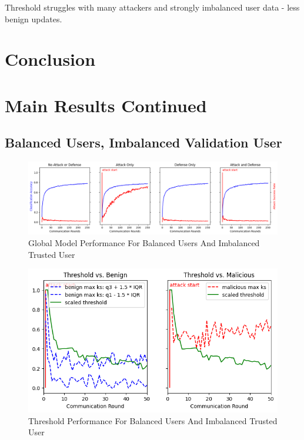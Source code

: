 \documentclass{article} %
\begin{document}
Threshold struggles with many attackers and strongly imbalanced user data - less benign updates.

% 
\section{Conclusion}

%



%
\appendix

%
\section{Main Results Continued}

%
\subsection{Balanced Users, Imbalanced Validation User}
\label{sec.imbal_val}

\begin{figure}[H]
    \centering
    \includegraphics[width=\textwidth]{01_trusted/centralized/alpha10000--alpha_val1/visuals/accuracy--n_malicious1--m_start1.png}
    \caption{Global Model Performance For Balanced Users And Imbalanced Trusted User}
    \label{fig:centralized--alpha10000--alpha_val1--accuracy--n_malicious1--m_start1}
\end{figure}

\begin{figure}[H]
    \centering
    \includegraphics[width=.75\textwidth]{01_trusted/centralized/alpha10000--alpha_val1/visuals/threshold--n_malicious1--m_start1--d_rounds50.png}
    \caption{Threshold Performance For Balanced Users And Imbalanced Trusted User}
    \label{fig:centralized--alpha10000--alpha_val1--threshold--n_malicious1--m_start1--d_rounds50}
\end{figure}
\end{document}
